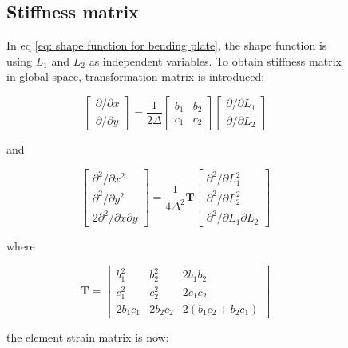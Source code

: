 \begin{figure}[h!]
\subsection{Stiffness matrix}
In eq \ref{eq: shape function for bending plate}, the shape function is using $ L_1 $ and $ L_2 $ as independent variables. To obtain stiffness matrix in global space, transformation matrix is introduced:

\begin{equation}\label{key}
\begin{bmatrix}
\partial / \partial x \\ 
\partial / \partial y
\end{bmatrix} = \frac{1}{2\Delta} \begin{bmatrix}
b_1 & b_2 \\ 
c_1 & c_2
\end{bmatrix} \begin{bmatrix}
\partial / \partial L_1 \\ 
\partial / \partial L_2
\end{bmatrix} 
\end{equation}

 and 
 
 \begin{equation}\label{key}
 \begin{bmatrix}
 \partial^2 / \partial x^2 \\ 
 \partial^2 / \partial y^2 \\
2 \partial^2 / \partial x \partial y
 \end{bmatrix} = \frac{1}{4\Delta^2} \mathbf{T} \begin{bmatrix}
 \partial^2 / \partial L_1^2 \\ 
 \partial^2 / \partial L_2^2 \\
 \partial^2 / \partial L_1 \partial L_2
 \end{bmatrix} 
 \end{equation}

where

\begin{equation}\label{key}
\mathbf{T} = \begin{bmatrix}
b_1^2 & b_2^2 & 2 b_1 b_2 \\ 
c_1^2 & c_2^2 & 2 c_1 c_2 \\ 
2 b_1 c_1 & 2 b_2 c_2 & 2 ( b_1 c_2 + b_2 c_1)
\end{bmatrix} 
\end{equation}

the element strain matrix is now:


\end{figure}
